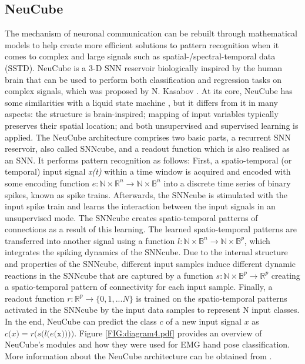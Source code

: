 \documentclass[journal,article,submit,moreauthors,pdftex,10pt,a4paper]{Definitions/mdpi}
\begin{document}
\subsection{NeuCube}
The mechanism of neuronal communication can be rebuilt through mathematical models to help create more efficient solutions to pattern recognition when it comes to complex and large signals such as spatial-/spectral-temporal data (SSTD). NeuCube is a 3-D SNN reservoir biologically inspired by the human brain that can be used to perform both classification and regression tasks on complex signals, which was proposed by N. Kasabov \cite{6}. At its core, NeuCube has some similarities with a liquid state machine \cite{34}, but it differs from it in many aspects: the structure is brain-inspired; mapping of input variables typically preserves their spatial location; and both unsupervised and supervised learning is applied. The NeuCube architecture comprises two basic parts, a recurrent SNN reservoir, also called SNNcube, and a readout function which is also realised as an SNN. It performs pattern recognition as follows: First, a spatio-temporal (or temporal) input signal \textit {x(t)} within a time window is acquired and encoded with some encoding function  $\mathrm{\textit {e}} : \mathbb{N} \times \mathbb{R}^\mathrm{\textit{n}} \rightarrow \mathbb{N} \times \mathbb{B}^\mathrm{\textit{n}}$ into a discrete time series of binary spikes, known as spike trains. Afterwards, the SNNcube is stimulated with the input spike train and learns the interaction between the input signals in an unsupervised mode. The SNNcube creates spatio-temporal patterns of connections as a result of this learning. The learned spatio-temporal patterns are transferred into another signal using a function $\mathrm{\textit{l}} : \mathbb{N} \times \mathbb{B}^\mathrm{\textit{n}} \rightarrow \mathbb{N} \times \mathbb{B}^\mathrm{\textit{p}}$, which integrates the spiking dynamics of the SNNcube. Due to the internal structure and properties of the SNNcube, different input samples induce different dynamic reactions in the SNNcube that are captured by a function $\mathrm{\textit{s}} : \mathbb{N} \times \mathbb{B}^\mathrm{\textit{p}} \rightarrow \mathbb{R}^\mathrm{\textit{p}}$ creating a spatio-temporal pattern of connectivity for each input sample. Finally, a readout function $\mathrm{\textit{r}} : \mathbb{R}^\mathrm{\textit{p}} \rightarrow \{0,1,...\mathrm{\textit{N}}\}$ is trained on the spatio-temporal patterns activated in the SNNcube by the input data samples to represent N input classes. In the end, NeuCube can predict the class $c$ of a new input signal $\textit{x}$ as $\textit{c(x)} = \mathrm{\textit{r(s(l(e(}x))))}$. Figure \ref{FIG:diagram4.pdf} provides an overview of NeuCube's modules and how they were used for EMG hand pose classification. More information about the NeuCube architecture can be obtained from \cite{6, 35, 36}.
\end{document}
